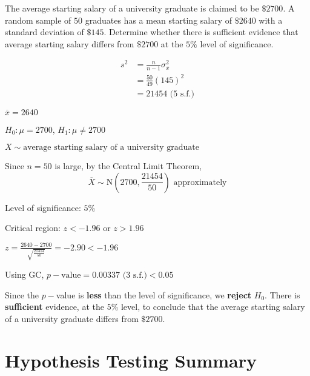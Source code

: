 \documentclass[11pt,a4paper]{book}
\begin{document}
\begin{example}

The average starting salary of a university graduate is claimed to
be $\$2700$. A random sample of $50$ graduates has a mean starting
salary of $\$2640$ with a standard deviation of $\$145$. Determine
whether there is sufficient evidence that average starting salary
differs from $\$2700$ at the $5\%$ level of significance.

\Solution

\begin{align*}
s^{2} & =\frac{n}{n-1}\sigma_{x}^{2}\\
 & =\frac{50}{49}\left(145\right)^{2}\\
 & =21454\text{ (5 s.f.)}
\end{align*}

$\overline{x}=2640$

$H_{0}:\mu=2700$, $H_{1}:\mu\neq2700$

$X\sim\text{average starting salary of a university graduate}$

Since $n=50$ is large, by the Central Limit Theorem,
\[
\overline{X}\sim\text{N}\left(2700,\frac{21454}{50}\right)\text{ approximately}
\]

Level of significance: $5\%$

Critical region: $z<-1.96$ or $z>1.96$

${\displaystyle z=\frac{2640-2700}{\sqrt{\frac{21454}{50}}}}=-2.90<-1.96$

Using GC, $p-\text{value}=0.00337\text{ (3 s.f.)}<0.05$

\begin{tcolorbox}[colback=white, colframe=black,boxrule=.4pt, sharpish corners]

Since the $p-$value is \textbf{less} than the level of significance,
we \textbf{reject} $H_{0}$. There is \textbf{sufficient} evidence,
at the $5\%$ level, to conclude that the average starting salary
of a university graduate differs from $\$2700$.
\end{tcolorbox}

\end{example}

\newpage

\section*{Hypothesis Testing Summary}
\end{document}
